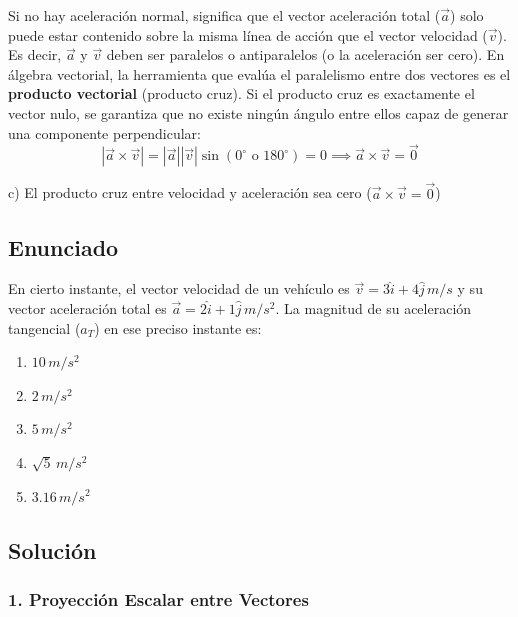 \documentclass[12pt, a4paper]{article}
\begin{document}
Si no hay aceleración normal, significa que el vector aceleración total ($\vec{a}$) solo puede estar contenido sobre la misma línea de acción que el vector velocidad ($\vec{v}$). Es decir, $\vec{a}$ y $\vec{v}$ deben ser paralelos o antiparalelos (o la aceleración ser cero).
En álgebra vectorial, la herramienta que evalúa el paralelismo entre dos vectores es el \textbf{producto vectorial} (producto cruz). 
Si el producto cruz es exactamente el vector nulo, se garantiza que no existe ningún ángulo entre ellos capaz de generar una componente perpendicular:
$$ |\vec{a} \times \vec{v}| = |\vec{a}||\vec{v}|\sin(0^\circ \text{ o } 180^\circ) = 0 \implies \vec{a} \times \vec{v} = \vec{0} $$

\begin{tcolorbox}[colback=green!5!white, colframe=green!50!black, title=Respuesta Final]
\centering \Large c) El producto cruz entre velocidad y aceleración sea cero ($\vec{a} \times \vec{v} = \vec{0}$)
\end{tcolorbox}

\newpage

\subsection*{Enunciado}
En cierto instante, el vector velocidad de un vehículo es $\vec{v} = 3\hat{i} + 4\hat{j} \,\si{m/s}$ y su vector aceleración total es $\vec{a} = 2\hat{i} + 1\hat{j} \,\si{m/s^2}$. La magnitud de su aceleración tangencial ($a_T$) en ese preciso instante es:
\begin{enumerate}[label=\alph*)]
    \item $10\,\si{m/s^2}$
    \item $2\,\si{m/s^2}$
    \item $5\,\si{m/s^2}$
    \item $\sqrt{5}\,\si{m/s^2}$
    \item $3.16\,\si{m/s^2}$
\end{enumerate}

\subsection*{Solución}

\subsubsection*{1. Proyección Escalar entre Vectores}
\end{document}
